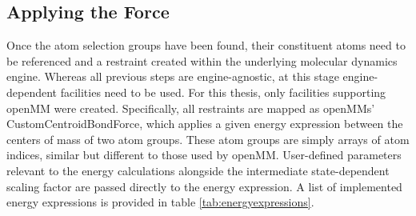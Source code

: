 \documentclass[oneside]{scrreprt}
\begin{document}
\subsection{Applying the Force}


Once the atom selection groups have been found, their constituent atoms need to be referenced and a restraint created within the underlying molecular dynamics engine. Whereas all previous steps are engine-agnostic, at this stage engine-dependent facilities need to be used. For this thesis, only facilities supporting openMM were created. Specifically, all restraints are mapped as openMMs' CustomCentroidBondForce, which applies a given energy expression between the centers of mass of two atom groups. These atom groups are simply arrays of atom indices, similar but different to those used by openMM. User-defined parameters relevant to the energy calculations alongside the intermediate state-dependent scaling factor are passed directly to the energy expression. A list of implemented energy expressions is provided in table \ref{tab:energyexpressions}.

\begin{table}[h]
\caption[Overview of the available energy expressions and their corresponding potential shapes.]{Overview of the available energy expressions and their corresponding potential shapes. $k$ refers to the spring constant, $r$ is the current and $r_0$ the initial distance between atom groups $g_1$, and $g_2$}
\label{tab:energyexpressions}
\end{table}
\end{document}
